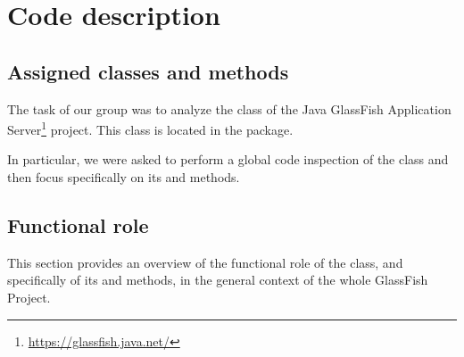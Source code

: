 \chapter{Code description}
\section{Assigned classes and methods}
The task of our group was to analyze the  class of the Java GlassFish Application Server\footnote{\url{https://glassfish.java.net/}} project. This class is located in the  package. 

In particular, we were asked to perform a global code inspection of the class and then focus specifically on its  and  methods.


\section{Functional role}
This section provides an overview of the functional role of the  class, and specifically of its  and  methods, in the general context of the whole GlassFish Project.

